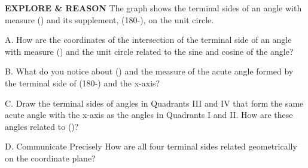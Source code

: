 \documentclass{article}
\newenvironment{model-discuss}{}{}      %
\newcommand{\answer}[1]{}               %
\newcommand{\placeholder}[2]{}          %
\newcommand{\te}[1]{}                   %
\begin{document}
\begin{model-discuss}
\textbf{EXPLORE \& REASON}
The graph shows the terminal sides of an angle with measure (\theta) and its supplement, (180-\theta), on the unit circle.
\placeholder{graph}{Black unit circle centered at O on arrowed x and y axes, ticks -1 and 1 on each axis. Red terminal points in Quadrants I and II labeled (x,y) and (?,?). Blue radii from O; red counterclockwise arcs from positive x-axis labeled theta and 180-theta.}
A. How are the coordinates of the intersection of the terminal side of an angle with measure (\theta) and the unit circle related to the sine and cosine of the angle?
\answer{The x-coordinates are equal to the cosine of angle, and the y-coordinates are equal to the sine of the angle.}
B. What do you notice about (\theta) and the measure of the acute angle formed by the terminal side of (180-\theta) and the x-axis?
\answer{The acute angles have the same measure.}
C. Draw the terminal sides of angles in Quadrants III and IV that form the same acute angle with the x-axis as the angles in Quadrants I and II. How are these angles related to (\theta)?
\answer{(180°+\theta) and (360-\theta).}
\placeholder{graph}{Sample student work C: black unit circle centered at red O, arrowed x/y axes, ticks -1 and 1 and light blue half-unit grid. Four red terminal points symmetric across both axes; upper-right (x,y) and angle theta. Blue radius to upper-right, red to upper-left, green to both lower points.}
D. Communicate Precisely How are all four terminal sides related geometrically on the coordinate plane?
\answer{They are reflections over the coordinate axes.}
\te{Digital screen repeats the introductory sentence and parts A and B, with Enter your answer boxes, Go back, ESSENTIAL QUESTION, and SOLUTION. In digital part A, the phrase ``measure theta'' is printed.}
\placeholder{graph}{Digital Desmos graph of the same unit circle: orange circle and terminal points (?,?) and (x,y), blue upper-right radius, orange upper-left radius, angle arcs theta and 180-theta, faint square grid; orange circle centered at plotted 0, viewport extends roughly two radii each way with zoom controls.}
\end{model-discuss}
\end{document}
